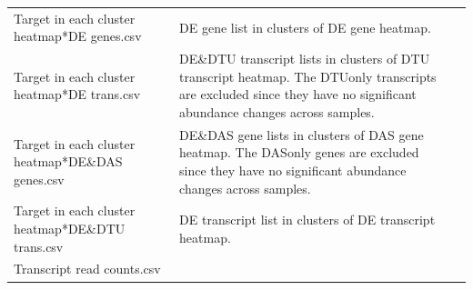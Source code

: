 \documentclass[]{article}
\begin{document}
\begin{longtable}[]{@{}lll@{}}
\begin{minipage}[t]{0.25\columnwidth}
Target in each cluster heatmap*DE genes.csv\strut
\end{minipage} & \begin{minipage}[t]{0.65\columnwidth}\raggedright\strut
DE gene list in clusters of DE gene heatmap.\strut
\end{minipage} & \begin{minipage}[t]{0.02\columnwidth}\raggedright\strut
\strut
\end{minipage}\tabularnewline
\begin{minipage}[t]{0.25\columnwidth}\raggedright\strut
Target in each cluster heatmap*DE trans.csv\strut
\end{minipage} & \begin{minipage}[t]{0.65\columnwidth}\raggedright\strut
DE\&DTU transcript lists in clusters of DTU transcript heatmap. The
DTUonly transcripts are excluded since they have no significant
abundance changes across samples.\strut
\end{minipage} & \begin{minipage}[t]{0.02\columnwidth}\raggedright\strut
\strut
\end{minipage}\tabularnewline
\begin{minipage}[t]{0.25\columnwidth}\raggedright\strut
Target in each cluster heatmap*DE\&DAS genes.csv\strut
\end{minipage} & \begin{minipage}[t]{0.65\columnwidth}\raggedright\strut
DE\&DAS gene lists in clusters of DAS gene heatmap. The DASonly genes
are excluded since they have no significant abundance changes across
samples.\strut
\end{minipage} & \begin{minipage}[t]{0.02\columnwidth}\raggedright\strut
\strut
\end{minipage}\tabularnewline
\begin{minipage}[t]{0.25\columnwidth}\raggedright\strut
Target in each cluster heatmap*DE\&DTU trans.csv\strut
\end{minipage} & \begin{minipage}[t]{0.65\columnwidth}\raggedright\strut
DE transcript list in clusters of DE transcript heatmap.\strut
\end{minipage} & \begin{minipage}[t]{0.02\columnwidth}\raggedright\strut
\strut
\end{minipage}\tabularnewline
\begin{minipage}[t]{0.25\columnwidth}\raggedright\strut
Transcript read counts.csv\strut
\end{minipage} & \begin{minipage}[t]{0.65\columnwidth}\raggedright\strut

\end{minipage}
\end{longtable}
\end{document}
